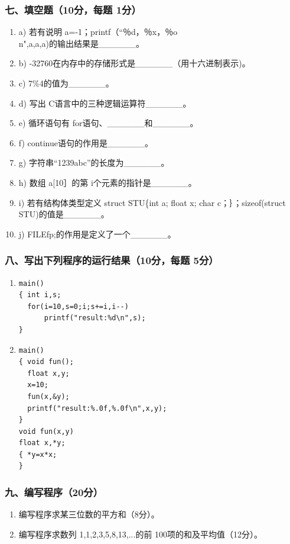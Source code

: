 \documentclass[12pt,a4paper]{article}
\begin{document}
\subsubsection*{七、填空题（10分，每题 1分）}
\begin{enumerate}
    \item a) 若有说明 a=-1；printf（“％d，％x，％o\\n",a,a,a)的输出结果是\_\_\_\_\_\_。
    \item b) -32760在内存中的存储形式是\_\_\_\_\_\_（用十六进制表示)。
    \item c) 7\%4的值为\_\_\_\_\_\_。
    \item d) 写出 C语言中的三种逻辑运算符\_\_\_\_\_\_。
    \item e) 循环语句有 for语句、\_\_\_\_\_\_和\_\_\_\_\_\_。
    \item f) continue语句的作用是\_\_\_\_\_\_。
    \item g) 字符串“123\19abc”的长度为\_\_\_\_\_\_。
    \item h) 数组 a[10］的第 i个元素的指针是\_\_\_\_\_\_。
    \item i) 若有结构体类型定义 struct STU\{int a; float x; char c；｝；sizeof(struct STU)的值是\_\_\_\_\_\_。
    \item j) FILE\*fp;的作用是定义了一个\_\_\_\_\_\_。
\end{enumerate}

\subsubsection*{八、写出下列程序的运行结果（10分，每题 5分）}
\begin{enumerate}
    \item 
    \begin{verbatim}
main()
{ int i,s;
  for(i=10,s=0;i;s+=i,i--)
      printf("result:%d\n",s);
}
    \end{verbatim}
    
    \item 
    \begin{verbatim}
main()
{ void fun();
  float x,y;
  x=10;
  fun(x,&y);
  printf("result:%.0f,%.0f\n",x,y);
}
void fun(x,y)
float x,*y;
{ *y=x*x;
}
    \end{verbatim}
\end{enumerate}

\subsubsection*{九、编写程序（20分）}
\begin{enumerate}
    \item 编写程序求某三位数的平方和（8分）。
    \item 编写程序求数列 1,1,2,3,5,8,13,...的前 100项的和及平均值（12分）。
\end{enumerate}
\end{document}
